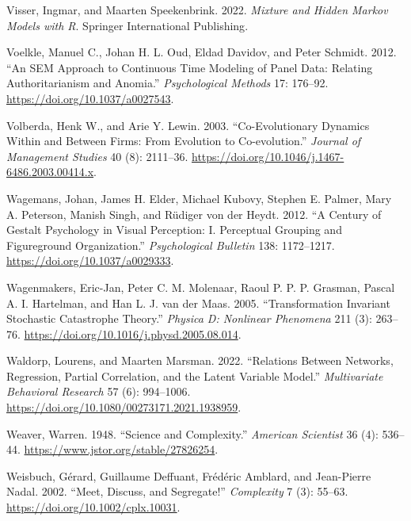 \documentclass[
  a4paper,
  DIV=11,
  numbers=noendperiod,
  oneside]{scrreprt}
\newlength{\cslhangindent}
\newlength{\cslentryspacingunit} %
\newenvironment{CSLReferences}[2] %
 {%
  \setlength{\parindent}{0pt}
  \ifodd #1
  \let\oldpar\par
  \def\par{\hangindent=\cslhangindent\oldpar}
  \fi
  \setlength{\parskip}{#2\cslentryspacingunit}
 }%
 {}
\begin{document}
\begin{CSLReferences}{1}{0}
\leavevmode{}%
Visser, Ingmar, and Maarten Speekenbrink. 2022. \emph{Mixture and
{Hidden Markov Models} with {R}}. {Springer International Publishing}.

\leavevmode{}%
Voelkle, Manuel C., Johan H. L. Oud, Eldad Davidov, and Peter Schmidt.
2012. {``An {SEM} Approach to Continuous Time Modeling of Panel Data:
{Relating} Authoritarianism and Anomia.''} \emph{Psychological Methods}
17: 176--92. \url{https://doi.org/10.1037/a0027543}.

\leavevmode{}%
Volberda, Henk W., and Arie Y. Lewin. 2003. {``Co-Evolutionary {Dynamics
Within} and {Between Firms}: {From Evolution} to {Co-evolution}.''}
\emph{Journal of Management Studies} 40 (8): 2111--36.
\url{https://doi.org/10.1046/j.1467-6486.2003.00414.x}.

\leavevmode{}%
Wagemans, Johan, James H. Elder, Michael Kubovy, Stephen E. Palmer, Mary
A. Peterson, Manish Singh, and Rüdiger von der Heydt. 2012. {``A Century
of {Gestalt} Psychology in Visual Perception: {I}. {Perceptual} Grouping
and Figure\textendash ground Organization.''} \emph{Psychological
Bulletin} 138: 1172--1217. \url{https://doi.org/10.1037/a0029333}.

\leavevmode{}%
Wagenmakers, Eric-Jan, Peter C. M. Molenaar, Raoul P. P. P. Grasman,
Pascal A. I. Hartelman, and Han L. J. van der Maas. 2005.
{``Transformation Invariant Stochastic Catastrophe Theory.''}
\emph{Physica D: Nonlinear Phenomena} 211 (3): 263--76.
\url{https://doi.org/10.1016/j.physd.2005.08.014}.

\leavevmode{}%
Waldorp, Lourens, and Maarten Marsman. 2022. {``Relations Between
{Networks}, {Regression}, {Partial Correlation}, and the {Latent
Variable Model}.''} \emph{Multivariate Behavioral Research} 57 (6):
994--1006. \url{https://doi.org/10.1080/00273171.2021.1938959}.

\leavevmode{}%
Weaver, Warren. 1948. {``Science and {Complexity}.''} \emph{American
Scientist} 36 (4): 536--44. \url{https://www.jstor.org/stable/27826254}.

\leavevmode{}%
Weisbuch, Gérard, Guillaume Deffuant, Frédéric Amblard, and Jean-Pierre
Nadal. 2002. {``Meet, Discuss, and Segregate!''} \emph{Complexity} 7
(3): 55--63. \url{https://doi.org/10.1002/cplx.10031}.


\end{CSLReferences}
\end{document}
